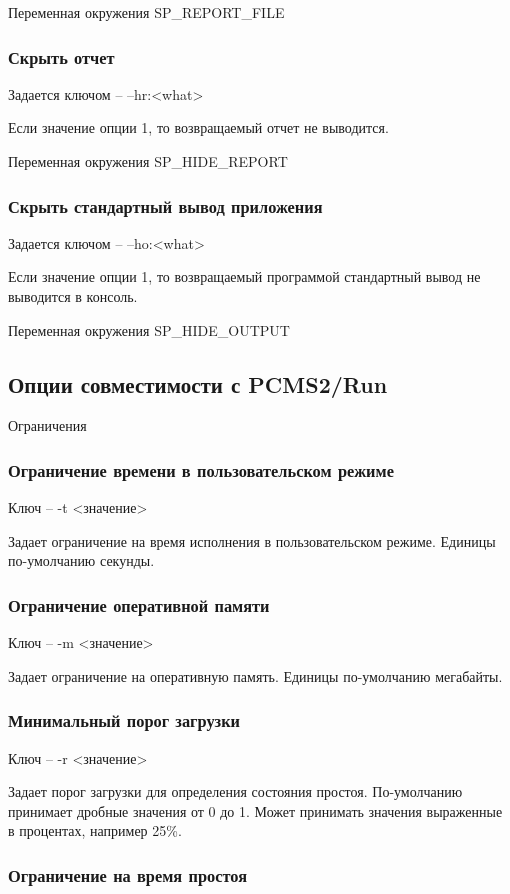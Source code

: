 \documentclass{imcs}
\begin{document}
Переменная окружения   SP\_REPORT\_FILE

\subsubsection{Скрыть отчет}
Задается ключом -- –hr:<what>

Если значение опции 1, то возвращаемый отчет не выводится.

Переменная окружения   SP\_HIDE\_REPORT

\subsubsection{Скрыть стандартный вывод приложения}
Задается ключом -- –ho:<what>

Если значение опции 1, то возвращаемый программой стандартный вывод не выводится в консоль.

Переменная окружения   SP\_HIDE\_OUTPUT
\subsection{Опции совместимости с PCMS2/Run}
{Ограничения}
\subsubsection{Ограничение времени в пользовательском режиме}

Ключ -- -t <значение>

Задает ограничение на время исполнения в пользовательском режиме. Единицы по-умолчанию секунды.
\subsubsection{Ограничение оперативной памяти}

Ключ -- -m <значение>

Задает ограничение на оперативную память. Единицы по-умолчанию мегабайты.
\subsubsection{Минимальный порог загрузки}

Ключ -- -r <значение>

Задает порог загрузки для определения состояния простоя. По-умолчанию принимает дробные значения от 0 до 1. Может принимать значения выраженные в процентах, например 25\%.
\subsubsection{Ограничение на время простоя}
\end{document}
